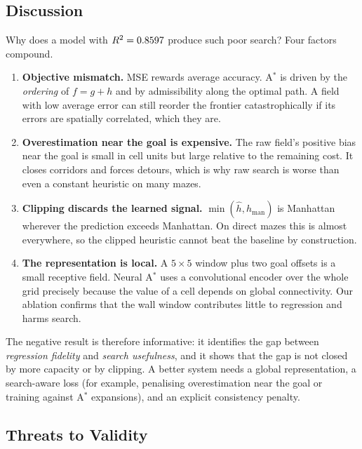 \subsection{Discussion}

Why does a model with $R^2=0.8597$ produce such poor search? Four factors compound.
\begin{enumerate}
  \item \textbf{Objective mismatch.} MSE rewards average accuracy. A$^\ast$ is driven by
  the \emph{ordering} of $f=g+h$ and by admissibility along the optimal path. A field
  with low average error can still reorder the frontier catastrophically if its errors
  are spatially correlated, which they are.
  \item \textbf{Overestimation near the goal is expensive.} The raw field's positive
  bias near the goal is small in cell units but large relative to the remaining cost.
  It closes corridors and forces detours, which is why raw search is worse than even a
  constant heuristic on many mazes.
  \item \textbf{Clipping discards the learned signal.} $\min(\hat h,h_{\text{man}})$ is
  Manhattan wherever the prediction exceeds Manhattan. On direct mazes this is almost
  everywhere, so the clipped heuristic cannot beat the baseline by construction.
  \item \textbf{The representation is local.} A $5\times5$ window plus two goal offsets
  is a small receptive field. Neural A$^\ast$ \cite{yonetani2021} uses a convolutional
  encoder over the whole grid precisely because the value of a cell depends on global
  connectivity. Our ablation confirms that the wall window contributes little to
  regression and harms search.
\end{enumerate}

The negative result is therefore informative: it identifies the gap between
\emph{regression fidelity} and \emph{search usefulness}, and it shows that the gap is
not closed by more capacity or by clipping. A better system needs a global
representation, a search-aware loss (for example, penalising overestimation near the
goal or training against A$^\ast$ expansions), and an explicit consistency penalty.

\subsection{Threats to Validity}

